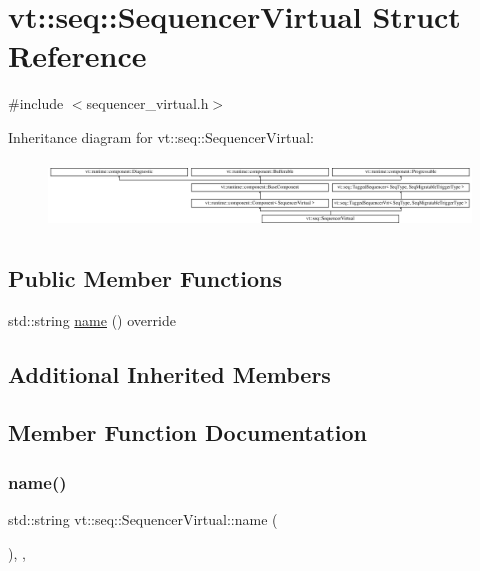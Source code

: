 \hypertarget{structvt_1_1seq_1_1_sequencer_virtual}{}\section{vt\+:\+:seq\+:\+:Sequencer\+Virtual Struct Reference}
\label{structvt_1_1seq_1_1_sequencer_virtual}


{\ttfamily \#include $<$sequencer\+\_\+virtual.\+h$>$}

Inheritance diagram for vt\+:\+:seq\+:\+:Sequencer\+Virtual\+:\begin{figure}[H]
\begin{center}
\leavevmode
\includegraphics[height=1.807910cm]{structvt_1_1seq_1_1_sequencer_virtual}
\end{center}
\end{figure}
\subsection*{Public Member Functions}
\begin{DoxyCompactItemize}
\item 
std\+::string \hyperlink{structvt_1_1seq_1_1_sequencer_virtual_ac51488cfa89d4749b1f5a85f7c2d180c}{name} () override
\end{DoxyCompactItemize}
\subsection*{Additional Inherited Members}


\subsection{Member Function Documentation}
\mbox{\label{structvt_1_1seq_1_1_sequencer_virtual_ac51488cfa89d4749b1f5a85f7c2d180c}} 
\subsubsection{\texorpdfstring{name()}{name()}}
{\footnotesize\ttfamily std\+::string vt\+::seq\+::\+Sequencer\+Virtual\+::name (\begin{DoxyParamCaption}{ }\end{DoxyParamCaption})\hspace{0.3cm}{\ttfamily [inline]}, {\ttfamily [override]}, {\ttfamily [virtual]}}




